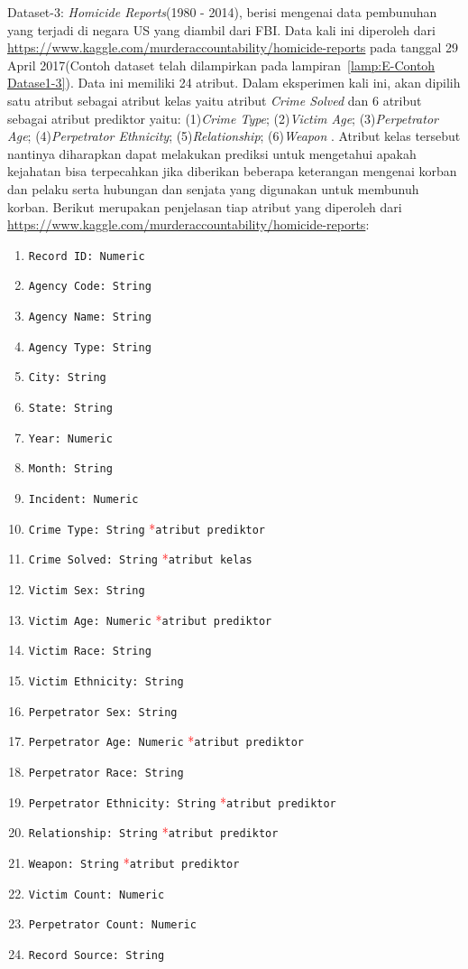 Dataset-3: \textit{Homicide Reports}(1980 - 2014), berisi mengenai data pembunuhan yang terjadi di negara US yang diambil dari FBI. Data kali ini diperoleh dari \url{https://www.kaggle.com/murderaccountability/homicide-reports} pada tanggal 29 April 2017(Contoh dataset telah dilampirkan pada lampiran~\ref{lamp:E-Contoh Datase1-3}). Data ini memiliki 24 atribut. Dalam eksperimen kali ini, akan dipilih satu atribut sebagai atribut kelas yaitu atribut \textit{Crime Solved} dan 6 atribut sebagai atribut prediktor yaitu: (1)\textit{Crime Type}; (2)\textit{Victim Age}; (3)\textit{Perpetrator Age}; (4)\textit{Perpetrator Ethnicity}; (5)\textit{Relationship}; (6)\textit{Weapon} . Atribut kelas tersebut nantinya diharapkan dapat melakukan prediksi untuk mengetahui apakah kejahatan bisa terpecahkan jika diberikan beberapa keterangan mengenai korban dan pelaku serta hubungan dan senjata yang digunakan untuk membunuh korban. Berikut merupakan penjelasan tiap atribut yang diperoleh dari \url{https://www.kaggle.com/murderaccountability/homicide-reports}:
\begin{enumerate}
	\item \texttt{Record ID: Numeric}
	\item \texttt{Agency Code: String}
	\item \texttt{Agency Name: String}
	\item \texttt{Agency Type: String}
	\item \texttt{City: String}
	\item \texttt{State: String}
	\item \texttt{Year: Numeric}
	\item \texttt{Month: String}
	\item \texttt{Incident: Numeric}
	\item \texttt{Crime Type: String} \textcolor{red}{*}\texttt{atribut prediktor}
	\item \texttt{Crime Solved: String} \textcolor{red}{*}\texttt{atribut kelas}
	\item \texttt{Victim Sex: String}
	\item \texttt{Victim Age: Numeric} \textcolor{red}{*}\texttt{atribut prediktor}
	\item \texttt{Victim Race: String}
	\item \texttt{Victim Ethnicity: String}
	\item \texttt{Perpetrator Sex: String}
	\item \texttt{Perpetrator Age: Numeric} \textcolor{red}{*}\texttt{atribut prediktor}
	\item \texttt{Perpetrator Race: String}
	\item \texttt{Perpetrator Ethnicity: String} \textcolor{red}{*}\texttt{atribut prediktor}
	\item \texttt{Relationship: String} \textcolor{red}{*}\texttt{atribut prediktor}
	\item \texttt{Weapon: String} \textcolor{red}{*}\texttt{atribut prediktor}
	\item \texttt{Victim Count: Numeric}
	\item \texttt{Perpetrator Count: Numeric}
	\item \texttt{Record Source: String}
\end{enumerate}

